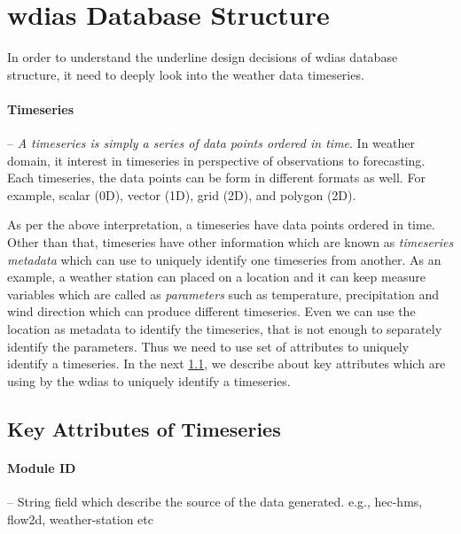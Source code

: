 \section{\acrshort{wdias} Database Structure}
\label{se:db_struct}

In order to understand the underline design decisions of \acrshort{wdias} database structure, it need to deeply look into the weather data timeseries.
\paragraph{Timeseries}-- \emph{A timeseries is simply a series of data points ordered in time}. In weather domain, it interest in timeseries in perspective of observations to forecasting. Each timeseries, the data points can be form in different formats as well. For example, scalar (0D), vector (1D), grid (2D), and polygon (2D).

As per the above interpretation, a timeseries have data points ordered in time. Other than that, timeseries have other information which are known as \emph{timeseries metadata} which can use to uniquely identify one timeseries from another. As an example, a weather station can placed on a location and it can keep measure variables which are called as \emph{parameters} such as temperature, precipitation and wind direction which can produce different timeseries. Even we can use the location as metadata to identify the timeseries, that is not enough to separately identify the parameters. Thus we need to use set of attributes to uniquely identify a timeseries. In the next \cref{subse:timeseries_key_attributes}, we describe about key attributes which are using by the \acrshort{wdias} to uniquely identify a timeseries.


\subsection{Key Attributes of Timeseries}
\label{subse:timeseries_key_attributes}
\paragraph{Module ID}-- String field which describe the source of the data generated. e.g., hec-hms, flow2d, weather-station etc

